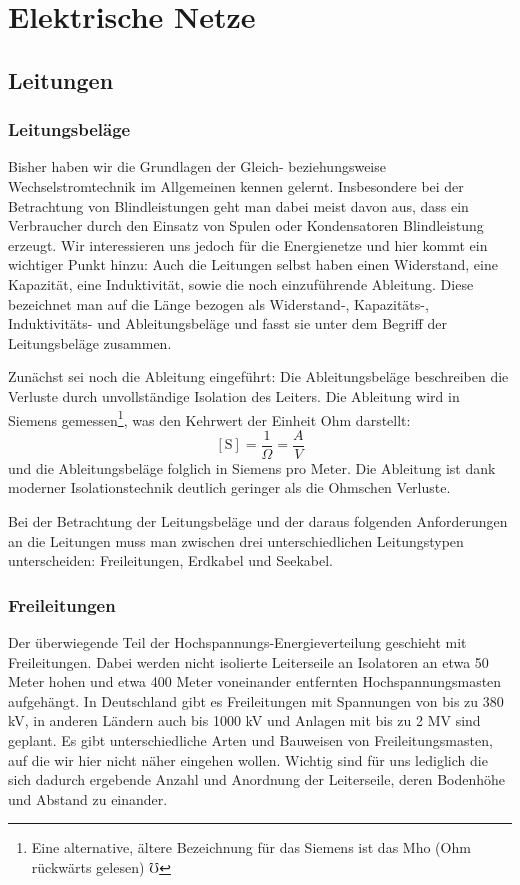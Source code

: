 \section{Elektrische Netze}

\subsection{Leitungen}

\subsubsection{Leitungsbeläge}
Bisher haben wir die Grundlagen der Gleich- beziehungsweise Wechselstromtechnik im Allgemeinen kennen gelernt.
Insbesondere bei der Betrachtung von Blindleistungen geht man dabei meist davon aus,
dass ein Verbraucher durch den Einsatz von Spulen oder Kondensatoren Blindleistung erzeugt.
Wir interessieren uns jedoch für die Energienetze und hier kommt ein wichtiger Punkt hinzu:
Auch die Leitungen selbst haben einen Widerstand, eine Kapazität, eine Induktivität, sowie die noch einzuführende Ableitung.
Diese bezeichnet man auf die Länge bezogen als Widerstand-, Kapazitäts-, Induktivitäts- und Ableitungsbeläge und fasst sie unter dem Begriff der Leitungsbeläge zusammen.

Zunächst sei noch die Ableitung eingeführt: Die Ableitungsbeläge beschreiben die Verluste durch unvollständige Isolation des Leiters. Die Ableitung wird in Siemens gemessen\footnote{Eine alternative, ältere Bezeichnung für das Siemens ist das Mho (Ohm rückwärts gelesen) $\mho$ }, was den Kehrwert der Einheit Ohm darstellt:
\begin{equation}
\mathrm{[S]} = \frac{1}{\Omega} = \frac{A}{V}
\end{equation}
und die Ableitungsbeläge folglich in Siemens pro Meter.
Die Ableitung ist dank moderner Isolationstechnik deutlich geringer als die Ohmschen Verluste.

Bei der Betrachtung der Leitungsbeläge und der daraus folgenden Anforderungen an die Leitungen muss man zwischen drei unterschiedlichen Leitungstypen unterscheiden: Freileitungen, Erdkabel und Seekabel.

\subsubsection{Freileitungen}
Der überwiegende Teil der Hochspannungs-Energieverteilung geschieht mit Freileitungen.
Dabei werden nicht isolierte Leiterseile an Isolatoren an etwa 50 Meter hohen und etwa 400 Meter voneinander entfernten Hochspannungsmasten aufgehängt. %
In Deutschland gibt es Freileitungen mit Spannungen von bis zu 380 kV, in anderen Ländern auch bis 1000 kV und Anlagen mit bis zu 2 MV sind geplant\cite{Flosdorff}.
Es gibt unterschiedliche Arten und Bauweisen von Freileitungsmasten, auf die wir hier nicht näher eingehen wollen. Wichtig sind für uns lediglich die sich dadurch ergebende Anzahl und Anordnung der Leiterseile, deren Bodenhöhe und Abstand zu einander.

